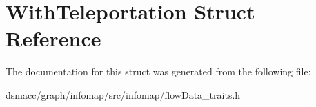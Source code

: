 \hypertarget{structWithTeleportation}{}\section{With\+Teleportation Struct Reference}
\label{structWithTeleportation}


The documentation for this struct was generated from the following file\+:\begin{DoxyCompactItemize}
\item 
dsmacc/graph/infomap/src/infomap/flow\+Data\+\_\+traits.\+h\end{DoxyCompactItemize}
